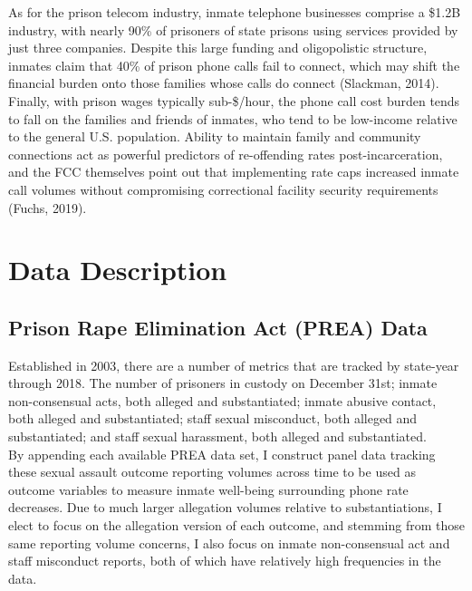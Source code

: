 As for the prison telecom industry, inmate telephone businesses comprise a \$1.2B industry, with nearly 90\% of prisoners of state prisons using services provided by just three companies. Despite this large funding and oligopolistic structure, inmates claim that 40\% of prison phone calls fail to connect, which may shift the financial burden onto those families whose calls do connect (Slackman, 2014). \\

Finally, with prison wages typically sub-\$/hour, the phone call cost burden tends to fall on the families and friends of inmates, who tend to be low-income relative to the general U.S. population. Ability to maintain family and community connections act as powerful predictors of re-offending rates post-incarceration, and the FCC themselves point out that implementing rate caps increased inmate call volumes without compromising correctional facility security requirements (Fuchs, 2019). 

\section{Data Description}
\subsection{Prison Rape Elimination Act (PREA) Data} 
Established in 2003, there are a number of metrics that are tracked by state-year through 2018. The number of prisoners in custody on December 31st; inmate non-consensual acts, both alleged and substantiated; inmate abusive contact, both alleged and substantiated; staff sexual misconduct, both alleged and substantiated; and staff sexual harassment, both alleged and substantiated. \\

By appending each available PREA data set, I construct panel data tracking these sexual assault outcome reporting volumes across time to be used as outcome variables to measure inmate well-being surrounding phone rate decreases. Due to much larger allegation volumes relative to substantiations, I elect to focus on the allegation version of each outcome, and stemming from those same reporting volume concerns, I also focus on inmate non-consensual act and staff misconduct reports, both of which have relatively high frequencies in the data. \\

